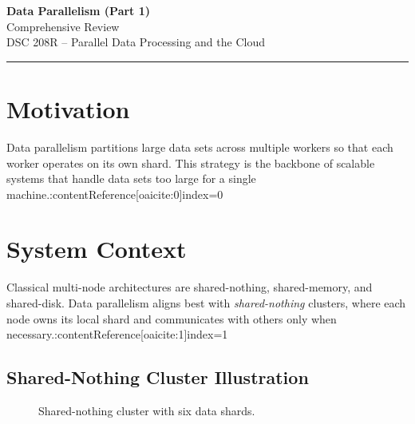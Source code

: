 \documentclass[11pt]{article}
\begin{document}
\begin{center}
  {\LARGE\bfseries Data Parallelism (Part 1)}\\[2mm]
  {\large Comprehensive Review}\\[1mm]
  {\normalsize DSC 208R -- Parallel Data Processing and the Cloud}
\end{center}
\vspace{-0.6em}\hrule\vspace{0.9em}

\tableofcontents
\newpage

\section{Motivation}

Data parallelism partitions large data sets across multiple workers so that each worker operates on its own shard.  This strategy is the backbone of scalable systems that handle data sets too large for a single machine.:contentReference[oaicite:0]{index=0}

\section{System Context}

Classical multi-node architectures are shared-nothing, shared-memory, and shared-disk.  Data parallelism aligns best with \emph{shared-nothing} clusters, where each node owns its local shard and communicates with others only when necessary.:contentReference[oaicite:1]{index=1}

\subsection*{Shared-Nothing Cluster Illustration}

\begin{figure}[h]
  \centering
  \caption{Shared-nothing cluster with six data shards.}
\end{figure}
\end{document}
